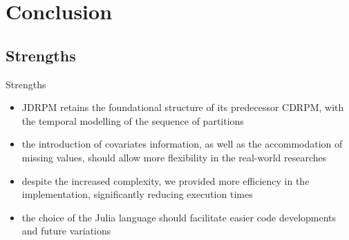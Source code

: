 \documentclass[
	11pt, %
 xcolor={dvipsnames,svgnames}
]{beamer}
\newcommand{\balert}[1]{\textbf{\alert{#1}}}
\begin{document}
\section{Conclusion}

\subsection{Strengths}
\begin{frame}{Strengths}
\begin{itemize}
    \item JDRPM retains the foundational structure of its predecessor CDRPM, with the temporal modelling of the sequence of partitions
    \item the introduction of covariates information, as well as the accommodation of missing values, should allow more flexibility in the real-world researches
    \item despite the increased complexity, we provided more efficiency in the implementation, significantly reducing execution times
    \item the choice of the Julia language should facilitate easier code developments and future variations
\end{itemize}
\end{frame}
\end{document}
